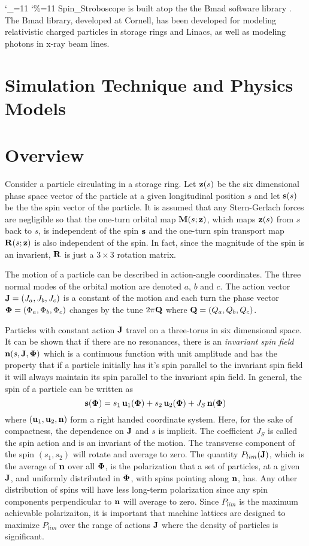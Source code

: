 \documentclass{hitec}
\newcommand{\Bf}[1]{{\bf #1}}
\newcommand{\bfn}{{\Bf n}}
\newcommand{\bfs}{{\Bf s}}
\newcommand{\bfu}{{\Bf u}}
\newcommand{\bfz}{{\Bf z}}
\newcommand{\bfJ}{{\Bf J}}
\newcommand{\bfM}{{\Bf M}}
\newcommand{\bfQ}{{\Bf Q}}
\newcommand{\bfR}{{\Bf R}}
\newcommand{\bfPhi}{{\Bf \Phi}}
\newcommand{\Plim}{P_{lim}}
\newcommand{\Begineq}{\begin{equation}}
\newcommand{\Endeq}{\end{equation}}
\newcommand{\sss}{\vn{Spin_Stroboscope}\xspace}
\newcommand{\vn}{\begingroup\catcode`\_=11 \catcode`\%=11 \dottcmd}
\newcommand\dottcmd[1]{{\usefont{T1}{lmss}{bx}{n} #1}\endgroup}
\newcounter{main}
\newcommand{\Section}[1]{\section{#1}\vspace*{-1ex}}
\begin{document}
\sss is built atop the the Bmad software library \cite{b:bmad}. The Bmad library, developed at
Cornell, has been developed for modeling relativistic charged particles in storage rings and Linacs,
as well as modeling photons in x-ray beam lines.

\Section{Simulation Technique and Physics Models}
\section{Overview} 

Consider a particle circulating in a storage ring. Let $\bfz(s)$ be the six dimensional
phase space vector of the particle at a given longitudinal position $s$ and let $\bfs(s)$ be the the
spin vector of the particle. It is assumed that any Stern-Gerlach forces are negligible so that the
one-turn orbital map $\bfM(s;\bfz)$, which maps $\bfz(s)$ from $s$ back to $s$, is independent of
the spin $\bfs$ and the one-turn spin transport map $\bfR(s;\bfz)$ is also independent of the spin.
In fact, since the magnitude of the spin is an invarient, $\bfR$ is just a $3 \times 3$ rotation
matrix.

The motion of a particle can be described in action-angle coordinates. The three normal modes of the
orbital motion are denoted $a$, $b$ and $c$. The action vector $\bfJ = (J_a, J_b, J_c)$ is a
constant of the motion and each turn the phase vector $\bfPhi = (\Phi_a, \Phi_b, \Phi_c)$ changes by
the tune $2\pi\bfQ$ where $\bfQ = (Q_a, Q_b, Q_c)$.

Particles with constant action $\bfJ$ travel on a three-torus in six dimensional space. It can be
shown that if there are no resonances, there is an {\em invariant spin field} $\bfn (s,
\bfJ, \bfPhi)$ which is a continuous function with unit amplitude and has the property that if a particle
initially has it's spin parallel to the invariant spin field it will always maintain its spin
parallel to the invariant spin field. In general, the spin of a particle can be written as
\Begineq
  \bfs(\bfPhi) = s_1 \, \bfu_1(\bfPhi) + s_2 \, \bfu_2(\bfPhi) + J_S \, \bfn(\bfPhi)
\Endeq
where $(\bfu_1, \bfu_2, \bfn)$ form a right handed coordinate system. Here, for the sake of
compactness, the dependence on $\bfJ$ and $s$ is implicit. The coefficient $J_S$ is called the spin
action and is an invariant of the motion. The transverse component of the spin $(s_1, s_2)$ will
rotate and average to zero. The quantity $\Plim(\bfJ)$, which is the average of $\bfn$ over all
$\bfPhi$, is the polarization that a set of particles, at a given $\bfJ$, and uniformly distributed
in $\bfPhi$, with spins pointing along $\bfn$, has. Any other distribution of spins will have less
long-term polarization since any spin components perpendicular to $\bfn$ will average to zero. Since 
$\Plim$ is the maximum achievable polarizaiton, it is important that machine lattices are designed
to maximize $\Plim$ over the range of actions $\bfJ$ where the density of particles is significant.
\end{document}
